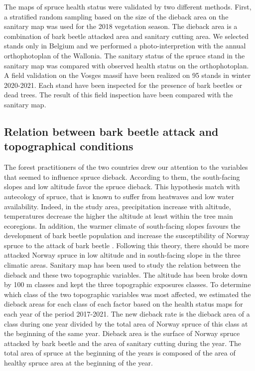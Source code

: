 \documentclass[3p,procedia]{elsarticle}
\begin{document}

The maps of spruce health status were validated by two different methods.
First, a stratified random sampling based on the size of the dieback area on the sanitary map was used for the 2018 vegetation season.
The dieback area is a combination of bark beetle attacked area and sanitary cutting area. 
We selected stands only in Belgium and we performed a photo-interpretion with the annual orthophotoplan of the Wallonia. The sanitary status of the spruce stand in the sanitary map was compared with observed health status on the orthophotoplan.
A field validation on the Vosges massif have been realized on 95 stands in winter 2020-2021.
Each stand have been inspected for the presence of bark beetles or dead trees. 
The result of this field inspection have been compared with the sanitary map. 

\subsection{Relation between bark beetle attack and topographical conditions}

The forest practitioners of the two countries drew our attention to the variables that seemed to influence spruce dieback.
According to them, the south-facing slopes and low altitude favor the spruce dieback.
This hypothesis match with autecology of spruce, that is known to suffer from heatwaves and low water availability.
Indeed, in the study area, precipitation increase with altitude, temperatures decrease the higher the altitude at least within the tree main ecoregions.
In addition, the warmer climate of south-facing slopes favours the development of bark beetle population \citep{annila_influence_1969, baier_phenipscomprehensive_2007, jonsson_2009, marini_climate_2012} and increase the susceptibility of Norway spruce to the attack of bark beetle \citep{wermelinger_ecology_2004, netherer_waterlimiting_2015}.
Following this theory, there should be more attacked Norway spruce in low altitude and in south-facing slope in the three climatic areas.
Sanitary map has been used to study the relation between the dieback and these two topographic variables.
The altitude has been broke down  by 100 m classes and kept the three topographic exposures classes.
To determine which class of the two topographic variables was most affected, we estimated the dieback areas for each class of each factor based on the health status maps for each year of the period 2017-2021.
The  new dieback rate is  the dieback area of a class during one year divided by the total area of Norway spruce of this class at the beginning of the same year. 
Dieback area is the surface of Norway spruce attacked by bark beetle and the area of sanitary cutting during the year. 
The total area of spruce at the beginning of the years is composed of the area of healthy spruce area at the beginning of the year. 
\end{document}
